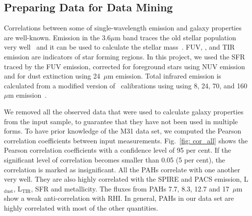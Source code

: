      \subsection{Preparing Data for Data Mining}
    
     Correlations between some of single-wavelength emission and galaxy properties are well-known.
     Emission in the 3.6$\mu$m band traces the old stellar population very well~\citep[e.g.][]{Smith07a,Leitherer99} and it can be used to calculate the stellar mass~\citep{Eskew12}.
     FUV, \halphadot, and TIR emission are indicators of star forming regions.
     In this project, we used the SFR traced by the FUV emission, corrected for foreground stars using NUV emission and for dust extinction using 24~$\mu$m emission.
     Total infrared emission is calculated from a modified version of~\cite{Draine07} calibrations using using 8, 24, 70, and 160~$\mu$m emission~\citep{Boquien10}.
    
    
    We removed all the observed data that were used to calculate galaxy properties from the input sample, to guarantee that they have not been used in multiple forms.
    To have prior knowledge of the M31 data set, 
    we computed the Pearson correlation coefficients between input measurements.
    Fig.~\ref{fig: cor_all} shows the Pearson correlation coefficients with a confidence level of 95 per cent. 
    If the significant level of correlation becomes smaller than 0.05 (5 per cent), the correlation is marked as insignificant. 
    All the PAHs correlate with one another very well.
    They are also highly correlated with the SPIRE and PACS emission, L$_\mathrm{dust}$, L$_\mathrm{TIR}$, SFR and metallicity.
    The fluxes from PAHs 7.7, 8.3, 12.7 and 17~$\mu$m show a weak anti-correlation with RHI.
    In general, PAHs in our data set are highly correlated with most of the other quantities. 
    
